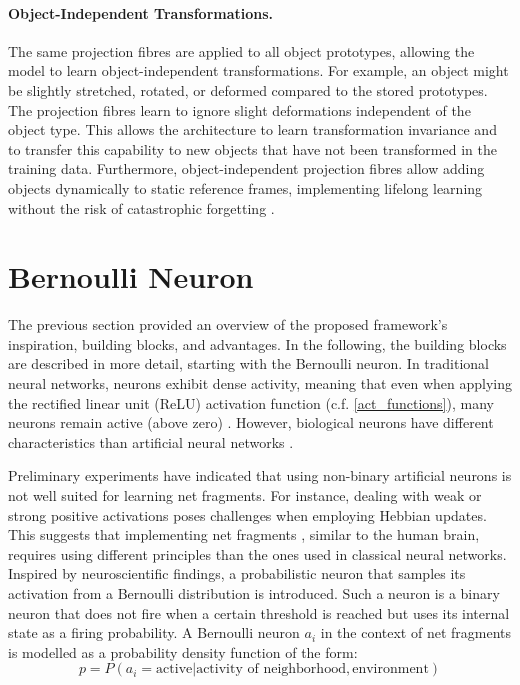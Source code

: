 \paragraph{Object-Independent Transformations.} The same projection fibres are applied to all object prototypes, allowing the model to learn object-independent transformations. For example, an object might be slightly stretched, rotated, or deformed compared to the stored prototypes. The projection fibres learn to ignore slight deformations independent of the object type. This allows the architecture to learn transformation invariance and to transfer this capability to new objects that have not been transformed in the training data.
Furthermore, object-independent projection fibres allow adding objects dynamically to static reference frames, implementing lifelong learning  without the risk of catastrophic forgetting .

\section{Bernoulli Neuron}
The previous section provided an overview of the proposed framework's inspiration, building blocks, and advantages. In the following, the building blocks are described in more detail, starting with the Bernoulli neuron.
In traditional neural networks, neurons exhibit dense activity, meaning that even when applying the rectified linear unit (ReLU) activation function (c.f. \eqref{act_functions}), many neurons remain active (above zero) . However, biological neurons have different characteristics than artificial neural networks .

Preliminary experiments have indicated that using non-binary artificial neurons is not well suited for learning net fragments. For instance, dealing with weak or strong positive activations poses challenges when employing Hebbian updates.
This suggests that implementing net fragments , similar to the human brain, requires using different principles than the ones used in classical neural networks. Inspired by neuroscientific findings, a probabilistic neuron that samples its activation from a Bernoulli distribution is introduced.
Such a neuron is a binary neuron that does not fire when a certain threshold is reached but uses its internal state as a firing probability. A Bernoulli neuron $a_i$ in the context of net fragments is modelled as a probability density function of the form:
\begin{equation}
    p = P(a_i = \text{active} | \text{activity of neighborhood}, \text{environment}) 
\end{equation}

